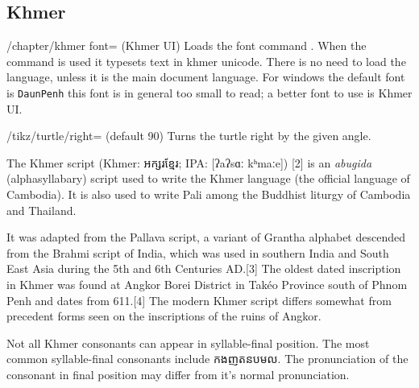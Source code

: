 \subsection{Khmer}
\newfontfamily{}
\normaltext

\def\khmerdefaultfont#1{\newfontfamily\khmer[Scale=MatchUppercase]{#1}}
\def\khmertext#1{{\khmer#1}}

\cxset{khmer font/.code=\khmerdefaultfont{#1}}



\begin{key}{/chapter/khmer font= (Khmer  UI)} Loads the font
command \cmd{\khmer}. When the command is used it typesets text in
khmer unicode. There is no need to load the language, unless it is the main document language. For windows the default font is \texttt{DaunPenh} this font is in general too small to read; a better font to use is Khmer UI.
\end{key}

\begin{key}{/tikz/turtle/right= (default 90)}
  Turns the turtle right by the given angle. 
\end{key}


The Khmer script (Khmer: {\Large\khmertext{អក្សរខ្មែរ}}; IPA: [ʔaʔsɑː kʰmaːe]) [2] is an \textit{abugida} (alphasyllabary) script used to write the Khmer language (the official language of Cambodia). It is also used to write Pali among the Buddhist liturgy of Cambodia and Thailand.

It was adapted from the Pallava script, a variant of Grantha alphabet descended from the Brahmi script of India, which was used in southern India and South East Asia during the 5th and 6th Centuries AD.[3] The oldest dated inscription in Khmer was found at Angkor Borei District in Takéo Province south of Phnom Penh and dates from 611.[4] The modern Khmer script differs somewhat from precedent forms seen on the inscriptions of the ruins of Angkor.

Not all Khmer consonants can appear in syllable-final position. The most common syllable-final consonants include {\khmer កងញតនបមល}. The pronunciation of the consonant in final position may differ from it's normal pronunciation.


